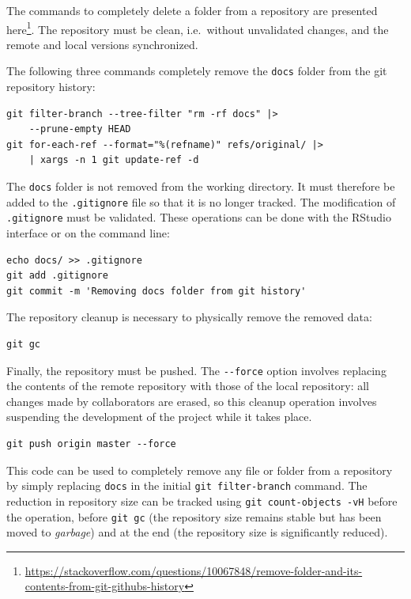 \documentclass[
  12pt,
  american,
  a4paper,
  extrafontsizes,onecolumn,openright
  ]{memoir}
\newlength{\rf}
\begin{document}
The commands to completely delete a folder from a repository are presented here\footnote{\url{https://stackoverflow.com/questions/10067848/remove-folder-and-its-contents-from-git-githubs-history}}.
The repository must be clean, i.e.~without unvalidated changes, and the remote and local versions synchronized.

The following three commands completely remove the \texttt{docs} folder from the git repository history:

\begin{verbatim}
git filter-branch --tree-filter "rm -rf docs" |>
    --prune-empty HEAD
git for-each-ref --format="%(refname)" refs/original/ |>
    | xargs -n 1 git update-ref -d
\end{verbatim}

The \texttt{docs} folder is not removed from the working directory.
It must therefore be added to the \texttt{.gitignore} file so that it is no longer tracked.
The modification of \texttt{.gitignore} must be validated.
These operations can be done with the RStudio interface or on the command line:

\begin{verbatim}
echo docs/ >> .gitignore
git add .gitignore
git commit -m 'Removing docs folder from git history'
\end{verbatim}

The repository cleanup is necessary to physically remove the removed data:

\begin{verbatim}
git gc
\end{verbatim}

Finally, the repository must be pushed.
The \texttt{-\/-force} option involves replacing the contents of the remote repository with those of the local repository: all changes made by collaborators are erased, so this cleanup operation involves suspending the development of the project while it takes place.

\begin{verbatim}
git push origin master --force
\end{verbatim}

This code can be used to completely remove any file or folder from a repository by simply replacing \texttt{docs} in the initial \texttt{git\ filter-branch} command.
The reduction in repository size can be tracked using \texttt{git\ count-objects\ -vH} before the operation, before \texttt{git\ gc} (the repository size remains stable but has been moved to \emph{garbage}) and at the end (the repository size is significantly reduced).
\end{document}

